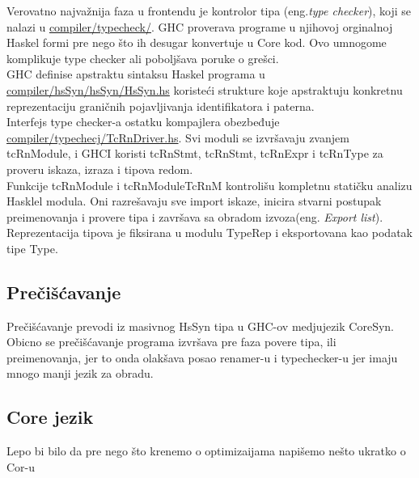 Verovatno najvažnija faza u frontendu je kontrolor tipa (eng.\emph{type checker}), koji se nalazi u \underline{compiler/typecheck/}. GHC proverava  programe u njihovoj orginalnoj Haskel formi pre nego što ih desugar konvertuje u Core kod. Ovo umnogome komplikuje type checker ali poboljšava poruke o grešci.\\
GHC definise apstraktu sintaksu Haskel programa u \underline{compiler/hsSyn/hsSyn/HsSyn.hs} koristeći strukture koje apstraktuju konkretnu reprezentaciju graničnih pojavljivanja identifikatora i paterna. \\
Interfejs type checker-a ostatku kompajlera obezbeđuje \underline{compiler/typechecj/TcRnDriver.hs}. Svi moduli se izvršavaju zvanjem tcRnModule, i GHCI koristi tcRnStmt, tcRnStmt, tcRnExpr 
i tcRnType za proveru iskaza, izraza i tipova redom. \\
Funkcije tcRnModule i tcRnModuleTcRnM kontrolišu kompletnu statičku analizu Hasklel modula. Oni razrešavaju sve import iskaze, inicira stvarni postupak preimenovanja i provere tipa i završava sa obradom izvoza(eng. \emph{Export list}).\\
Reprezentacija tipova je fiksirana u modulu TypeRep i eksportovana kao podatak tipe Type.

\subsection{Prečišćavanje}
\label{subsec:podnaslovDesugar}

Prečišćavanje prevodi iz masivnog HsSyn tipa u GHC-ov medjujezik CoreSyn. Obicno se prečišćavanje programa izvršava pre faza povere tipa, ili preimenovanja, jer to onda olakšava posao renamer-u i typechecker-u jer imaju mnogo manji jezik za obradu.

\subsection{Core jezik}
\label{subsec:podnaslovCore}

Lepo bi bilo da pre nego što krenemo o optimizaijama napišemo nešto ukratko o Cor-u
